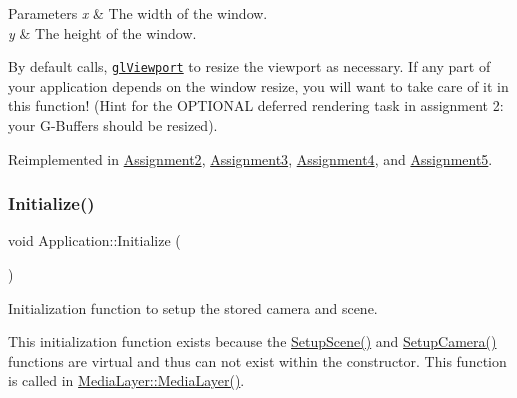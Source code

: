 \begin{DoxyParams}{Parameters}
{\em x} & The width of the window. \\
\hline
{\em y} & The height of the window.\\
\hline
\end{DoxyParams}
By default calls, \href{https://www.opengl.org/sdk/docs/man/html/glViewport.xhtml}{\tt gl\+Viewport} to resize the viewport as necessary. If any part of your application depends on the window resize, you will want to take care of it in this function! (Hint for the O\+P\+T\+I\+O\+N\+AL deferred rendering task in assignment 2\+: your \textquotesingle{}G-\/\+Buffers\textquotesingle{} should be resized).

Reimplemented in \hyperlink{class_assignment2_a1af734567de5e8e73a2fd726fe3914f2}{Assignment2}, \hyperlink{class_assignment3_a851c637c83c8092d8adfb5c9f761daeb}{Assignment3}, \hyperlink{class_assignment4_ac79558272dc476db3ee4a99793f401f2}{Assignment4}, and \hyperlink{class_assignment5_a0e7325af72d41b95f9a19ebe1440e756}{Assignment5}.

\hypertarget{class_application_a17cf1ea4552d26a1c20f7d98d793d41d}{}\label{class_application_a17cf1ea4552d26a1c20f7d98d793d41d}
\subsubsection{\texorpdfstring{Initialize()}{Initialize()}}
{\footnotesize\ttfamily void Application\+::\+Initialize (\begin{DoxyParamCaption}{ }\end{DoxyParamCaption})\hspace{0.3cm}{\ttfamily [virtual]}}



Initialization function to setup the stored camera and scene.

This initialization function exists because the \hyperlink{class_application_aa8e8017ef8dd86293c96d0645e66d440}{Setup\+Scene()} and \hyperlink{class_application_a2eb61ca027f223a5c5ad1bf982481193}{Setup\+Camera()} functions are virtual and thus can not exist within the constructor. This function is called in \hyperlink{class_media_layer_aea3b3bc36411af90517692b110d2829a}{Media\+Layer\+::\+Media\+Layer()}. \hypertarget{class_application_a454a1d926759c4bfac47e730570a7743}{}\label{class_application_a454a1d926759c4bfac47e730570a7743}
